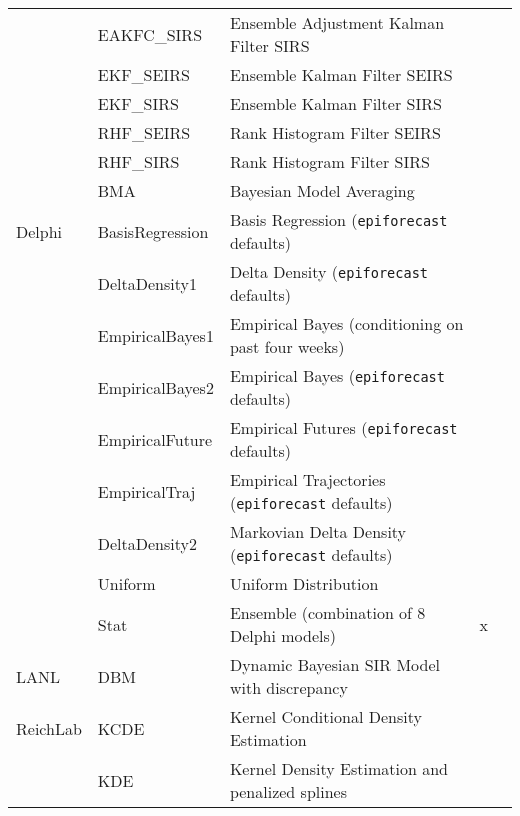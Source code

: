 \begin{table}
\begin{tabular}{p{1.6cm} l p{7.5cm} c  p{1cm}  }
~        & EAKFC\_SIRS        & Ensemble Adjustment Kalman Filter SIRS && \cite{Pei2017}   \\
~        & EKF\_SEIRS         & Ensemble Kalman Filter SEIRS && \cite{Yang2014}                   \\
~        & EKF\_SIRS          & Ensemble Kalman Filter SIRS && \cite{Yang2014}                      \\
~        & RHF\_SEIRS         & Rank Histogram Filter SEIRS && \cite{Yang2014}                    \\
~        & RHF\_SIRS          & Rank Histogram Filter SIRS && \cite{Yang2014}                   \\
~        & BMA                & Bayesian Model Averaging && \cite{Yamana2017}               \\
\hline
Delphi   & BasisRegression    & Basis Regression ({\tt epiforecast} defaults) && \cite{Brooks2015a}              \\ 
~        & DeltaDensity1      & Delta Density ({\tt epiforecast} defaults)   && \cite{Brooks2015a}              \\ 
~        & EmpiricalBayes1    & Empirical Bayes (conditioning on past four weeks) && \cite{Brooks2015,Brooks2015a}        \\ 
~        & EmpiricalBayes2    & Empirical Bayes ({\tt epiforecast} defaults) && \cite{Brooks2015,Brooks2015a}      \\ 
~        & EmpiricalFuture    & Empirical Futures ({\tt epiforecast} defaults) &&  \cite{Brooks2015a}      \\ 
~        & EmpiricalTraj      & Empirical Trajectories ({\tt epiforecast} defaults)&& \cite{Brooks2015a}            \\ 
~        & DeltaDensity2      & Markovian Delta Density ({\tt epiforecast} defaults)&& \cite{Brooks2015a}          \\ 
~        & Uniform            & Uniform Distribution& &     \\ 
~        & Stat               & Ensemble (combination of 8 Delphi models)& x &                 \\
\hline
LANL     & DBM                & Dynamic Bayesian SIR Model with discrepancy && \cite{Osthus2017}     \\ 
\hline
ReichLab & KCDE               & Kernel Conditional Density Estimation && \cite{Ray2017}    \\ 
~        & KDE                & Kernel Density Estimation and penalized splines & & \cite{Ray2018} \\ 

\end{tabular}
\end{table}
